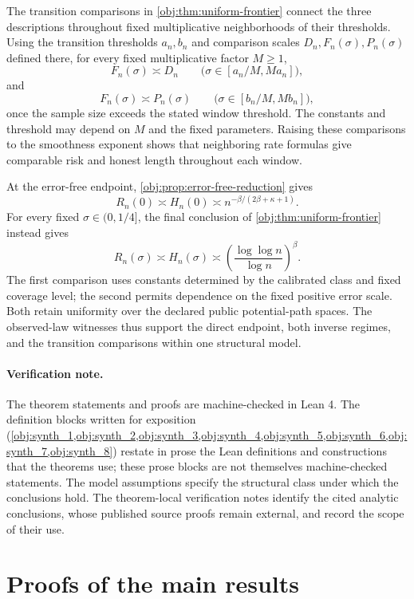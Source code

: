 \documentclass[11pt]{article}
\begin{document}
The transition comparisons in \cref{obj:thm:uniform-frontier} connect the three descriptions throughout fixed multiplicative neighborhoods of their thresholds. Using the transition thresholds \(a_n,b_n\) and comparison scales \(D_n,F_n(\sigma),P_n(\sigma)\) defined there, for every fixed multiplicative factor \(M\ge1\),
\[
F_n(\sigma)\asymp D_n
\qquad
\bigl(\sigma\in[a_n/M,Ma_n]\bigr),
\]
and
\[
F_n(\sigma)\asymp P_n(\sigma)
\qquad
\bigl(\sigma\in[b_n/M,Mb_n]\bigr),
\]
once the sample size exceeds the stated window threshold. The constants and threshold may depend on \(M\) and the fixed parameters. Raising these comparisons to the smoothness exponent shows that neighboring rate formulas give comparable risk and honest length throughout each window.

At the error-free endpoint, \cref{obj:prop:error-free-reduction} gives
\[
R_n(0)\asymp H_n(0)\asymp n^{-\beta/(2\beta+\kappa+1)}.
\]
For every fixed \(\sigma\in(0,1/4]\), the final conclusion of \cref{obj:thm:uniform-frontier} instead gives
\[
R_n(\sigma)\asymp H_n(\sigma)
\asymp
\left(\frac{\log\log n}{\log n}\right)^\beta.
\]
The first comparison uses constants determined by the calibrated class and fixed coverage level; the second permits dependence on the fixed positive error scale. Both retain uniformity over the declared public potential-path spaces. The observed-law witnesses thus support the direct endpoint, both inverse regimes, and the transition comparisons within one structural model.

\paragraph{Verification note.}
The theorem statements and proofs are machine-checked in Lean 4. The definition blocks written for exposition (\cref{obj:synth_1,obj:synth_2,obj:synth_3,obj:synth_4,obj:synth_5,obj:synth_6,obj:synth_7,obj:synth_8}) restate in prose the Lean definitions and constructions that the theorems use; these prose blocks are not themselves machine-checked statements. The model assumptions specify the structural class under which the conclusions hold. The theorem-local verification notes identify the cited analytic conclusions, whose published source proofs remain external, and record the scope of their use.


\section{Proofs of the main results}\label{sec:deferred-proofs}
\end{document}
